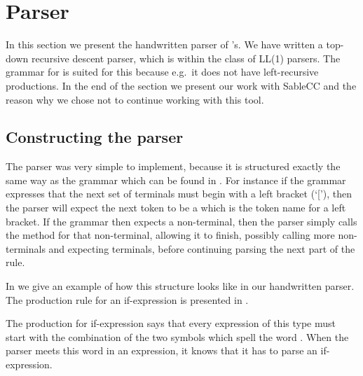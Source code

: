 \section{Parser}
\label{sec:parserimplementation}

In this section we present the handwritten parser of \productname{}'s.
We have written a top-down recursive descent parser, which is within the class
of LL(1) parsers. The grammar for \productname{} is suited for this because
e.g.\ it does not have left-recursive productions. In the end of the section we present our work 
with SableCC and the reason why we chose not to continue working with this tool.

\subsection{Constructing the parser}
The parser was very simple to implement, because it is structured exactly the same way as the
grammar which can be found in .  For instance if the grammar
expresses that the next set of terminals must begin with a left bracket (`['),
  then the parser will expect the next token to be a  which
  is the token name for a left bracket. If the grammar then expects a
  non-terminal, then the parser simply calls the method for that non-terminal,
  allowing it to finish, possibly calling more non-terminals and expecting
  terminals, before continuing parsing the next part of the rule.

In  we give an example of how this structure looks like in
our handwritten parser. The production rule for an if-expression is presented in
.


The production for if-expression says that every expression of this type
must start with the combination of the two symbols which spell the word
. When the parser meets this word in an expression, it knows
that it has to parse an if-expression.



